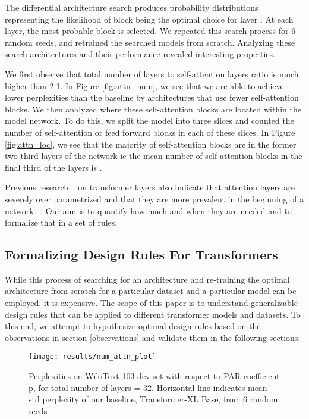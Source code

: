 \documentclass[11pt]{article}
\begin{document}
The differential architecture search produces probability distributions  representing the likelihood of block  being the optimal choice for layer . At each layer, the most probable block is selected. We repeated this search process for 6 random seeds, and retrained the searched models from scratch. Analyzing these search architectures and their performance revealed interesting properties.

We first observe that total number of layers to self-attention layers ratio is much higher than 2:1. In Figure \ref{fig:attn_num}, we see that we are able to achieve lower perplexities than the baseline by architectures that use fewer self-attention blocks. We then analyzed where these self-attention blocks are located within the model network. To do this, we split the model into three slices and counted the number of self-attention or feed forward blocks in each of these slices. In Figure \ref{fig:attn_loc}, we see that the majority of self-attention blocks are in the former two-third layers of the network ie the mean number of self-attention blocks in the final third of the layers is .

Previous research ~\citep{darksecretsofbert,collaborate} on transformer layers also indicate that attention layers are severely over parametrized and that they are more prevalent in the beginning of a network ~\citep{SandwichTransformer}. Our aim is to quantify how much and when they are needed and to formalize that in a set of rules.

\subsection{Formalizing Design Rules For Transformers} \label{design_rules}

While this process of searching for an architecture and re-training the optimal architecture from scratch for a particular dataset and a particular model can be employed, it is expensive. The scope of this paper is to understand generalizable design rules that can be applied to different transformer models and datasets. To this end, we attempt to hypothesize optimal design rules based on the observations in section \ref{observations} and validate them in the following sections. 

\begin{figure}
\centering
\texttt{[image: results/num\_attn\_plot]}
\caption{Perplexities on WikiText-103 dev set with respect to PAR coefficient p, for total number of layers = 32. Horizontal line indicates mean +- std perplexity of our baseline, Transformer-XL Base, from 6 random seeds}
\label{fig:num_attn_plot}
\end{figure}
\end{document}
